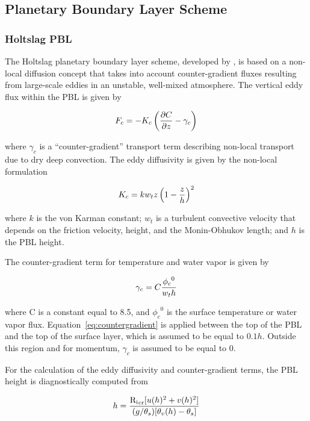 \subsection{Planetary Boundary Layer Scheme}

\subsubsection{Holtslag PBL}

The Holtslag planetary boundary layer scheme, developed by \cite{Holtslag_90},
is based on a non-local diffusion concept that takes into account
counter-gradient fluxes resulting from large-scale eddies in an unstable,
well-mixed atmosphere.  The vertical eddy flux within the PBL is given by

\begin{eqnarray}
F_c = -K_c \left( {\partial{C} \over \partial{z}} - \gamma_c \right)
\end{eqnarray}

where $\gamma_c$ is a ``counter-gradient'' transport term describing
non-local transport due to dry deep convection.
The eddy diffusivity is given by the non-local formulation

\begin{eqnarray}
K_c = kw_tz \left( 1- {z \over h} \right)^2
\end{eqnarray}

where $k$ is the von Karman constant; $w_t$ is a turbulent convective
velocity that depends on the friction velocity, height, and the Monin-Obhukov
length;  and $h$ is the PBL height.

The counter-gradient term for temperature and water vapor is given by

\begin{eqnarray}
\label{eq:countergradient}
\gamma_c = C { {\phi_c}^0 \over w_t h}
\end{eqnarray}

where C is a constant equal to 8.5, and ${\phi_c}^0$ is the surface
temperature or water vapor flux. Equation~\ref{eq:countergradient} is applied
between the top of the PBL and the top of the surface layer, which is assumed to
be equal to $0.1h$. Outside this region and for momentum, $\gamma_c$ is assumed
to be equal to 0.  

For the calculation of the eddy diffusivity and counter-gradient terms, the PBL
height is diagnostically computed from

\begin{eqnarray}
  h = { {\rm {R_i}_{cr}} [u(h)^2 + v(h)^2] \over (g/\theta_s)[\theta_v(h)-\theta_s] }
\end{eqnarray}

